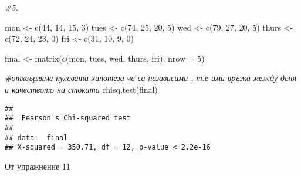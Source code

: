 \documentclass[
]{article}
\newenvironment{Shaded}{\begin{snugshade}}{\end{snugshade}}
\newcommand{\AttributeTok}[1]{\textcolor[rgb]{0.77,0.63,0.00}{#1}}
\newcommand{\CommentTok}[1]{\textcolor[rgb]{0.56,0.35,0.01}{\textit{#1}}}
\newcommand{\DecValTok}[1]{\textcolor[rgb]{0.00,0.00,0.81}{#1}}
\newcommand{\FunctionTok}[1]{\textcolor[rgb]{0.00,0.00,0.00}{#1}}
\newcommand{\NormalTok}[1]{#1}
\newcommand{\OtherTok}[1]{\textcolor[rgb]{0.56,0.35,0.01}{#1}}
\begin{document}
\begin{Shaded}
\begin{Highlighting}[]
\CommentTok{\#5.}

\NormalTok{mon }\OtherTok{\textless{}{-}} \FunctionTok{c}\NormalTok{(}\DecValTok{44}\NormalTok{, }\DecValTok{14}\NormalTok{, }\DecValTok{15}\NormalTok{, }\DecValTok{3}\NormalTok{)}
\NormalTok{tues }\OtherTok{\textless{}{-}} \FunctionTok{c}\NormalTok{(}\DecValTok{74}\NormalTok{, }\DecValTok{25}\NormalTok{, }\DecValTok{20}\NormalTok{, }\DecValTok{5}\NormalTok{)}
\NormalTok{wed }\OtherTok{\textless{}{-}} \FunctionTok{c}\NormalTok{(}\DecValTok{79}\NormalTok{, }\DecValTok{27}\NormalTok{, }\DecValTok{20}\NormalTok{, }\DecValTok{5}\NormalTok{)}
\NormalTok{thurs }\OtherTok{\textless{}{-}} \FunctionTok{c}\NormalTok{(}\DecValTok{72}\NormalTok{, }\DecValTok{24}\NormalTok{, }\DecValTok{23}\NormalTok{, }\DecValTok{0}\NormalTok{)}
\NormalTok{fri }\OtherTok{\textless{}{-}} \FunctionTok{c}\NormalTok{(}\DecValTok{31}\NormalTok{, }\DecValTok{10}\NormalTok{, }\DecValTok{9}\NormalTok{, }\DecValTok{0}\NormalTok{)}

\NormalTok{final }\OtherTok{\textless{}{-}} \FunctionTok{matrix}\NormalTok{(}\FunctionTok{c}\NormalTok{(mon, tues, wed, thurs, fri), }\AttributeTok{nrow =} \DecValTok{5}\NormalTok{)}

\CommentTok{\#отхвърляме нулевата хипотеза че са независими , т.е има връзка между деня и качеството на стоката}
\FunctionTok{chisq.test}\NormalTok{(final)}
\end{Highlighting}
\end{Shaded}

\begin{verbatim}
## 
##  Pearson's Chi-squared test
## 
## data:  final
## X-squared = 350.71, df = 12, p-value < 2.2e-16
\end{verbatim}

От упражнение 11
\end{document}
